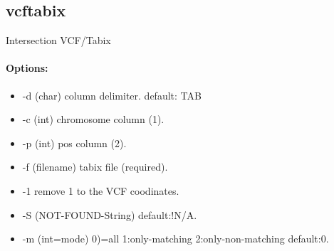 \documentclass[12pt]{article}
\begin{document}
\subsection{vcftabix}
Intersection VCF/Tabix
\paragraph{Options:}
\begin{itemize}
\item-d (char) column delimiter. default: TAB
\item-c (int) chromosome column (1).
\item-p (int) pos column (2).
\item-f (filename) tabix file (required).
\item-1 remove 1 to the VCF coodinates.
\item-S (NOT-FOUND-String) default:!N/A.
\item-m  (int=mode) 0)=all 1:only-matching  2:only-non-matching default:0.
\end{itemize}
\end{document}

